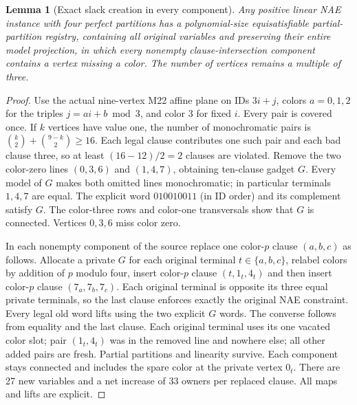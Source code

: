 \documentclass[11pt]{article}
\newtheorem{lemma}[theorem]{Lemma}
\begin{document}
\begin{lemma}[Exact slack creation in every component]\label{lem:ds16-slack}
Any positive linear NAE instance with four perfect partitions has a polynomial-size equisatisfiable partial-partition registry, containing all original variables and preserving their entire model projection, in which every nonempty clause-intersection component contains a vertex missing a color. The number of vertices remains a multiple of three.
\end{lemma}
\begin{proof}
Use the actual nine-vertex M22 affine plane on IDs $3i+j$, colors $a=0,1,2$ for the triples $j=ai+b\bmod3$, and color 3 for fixed $i$. Every pair is covered once. If $k$ vertices have value one, the number of monochromatic pairs is $\binom{k}{2}+\binom{9-k}{2}\ge16$. Each legal clause contributes one such pair and each bad clause three, so at least $(16-12)/2=2$ clauses are violated. Remove the two color-zero lines $(0,3,6)$ and $(1,4,7)$, obtaining ten-clause gadget $G$. Every model of $G$ makes both omitted lines monochromatic; in particular terminals $1,4,7$ are equal. The explicit word $010010011$ (in ID order) and its complement satisfy $G$. The color-three rows and color-one transversals show that $G$ is connected. Vertices $0,3,6$ miss color zero.

In each nonempty component of the source replace one color-$p$ clause $(a,b,c)$ as follows. Allocate a private $G$ for each original terminal $t\in\{a,b,c\}$, relabel colors by addition of $p$ modulo four, insert color-$p$ clause $(t,1_t,4_t)$ and then insert color-$p$ clause $(7_a,7_b,7_c)$. Each original terminal is opposite its three equal private terminals, so the last clause enforces exactly the original NAE constraint. Every legal old word lifts using the two explicit $G$ words. The converse follows from equality and the last clause. Each original terminal uses its one vacated color slot; pair $(1_t,4_t)$ was in the removed line and nowhere else; all other added pairs are fresh. Partial partitions and linearity survive. Each component stays connected and includes the spare color at the private vertex $0_t$. There are 27 new variables and a net increase of 33 owners per replaced clause. All maps and lifts are explicit.
\end{proof}
\end{document}
